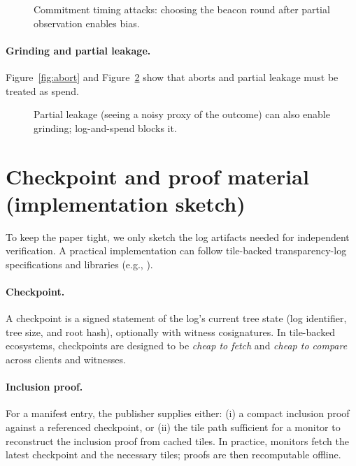 \documentclass[11pt]{article}
\begin{document}
\begin{figure}[t]
\centering
{}
\caption{Commitment timing attacks: choosing the beacon round after partial observation enables bias.}
\label{fig:commit_timing}
\end{figure}

\paragraph{Grinding and partial leakage.}
Figure~\ref{fig:abort} and Figure~\ref{fig:partial_leak} show that aborts and partial leakage must be treated as spend.

\begin{figure}[t]
\centering
{}
\caption{Partial leakage (seeing a noisy proxy of the outcome) can also enable grinding; log-and-spend blocks it.}
\label{fig:partial_leak}
\end{figure}

\appendix
\section{Checkpoint and proof material (implementation sketch)}
To keep the paper tight, we only sketch the log artifacts needed for independent verification.
A practical implementation can follow tile-backed transparency-log specifications and libraries (e.g., \cite{c2sp_tlog_checkpoint,c2sp_tlog_tiles,c2sp_tlog_proof,c2sp_tlog_witness,tessera_github}).

\paragraph{Checkpoint.}
A checkpoint is a signed statement of the log's current tree state (log identifier, tree size, and root hash), optionally with witness cosignatures.
In tile-backed ecosystems, checkpoints are designed to be \emph{cheap to fetch} and \emph{cheap to compare} across clients and witnesses.

\paragraph{Inclusion proof.}
For a manifest entry, the publisher supplies either:
(i) a compact inclusion proof against a referenced checkpoint, or
(ii) the tile path sufficient for a monitor to reconstruct the inclusion proof from cached tiles.
In practice, monitors fetch the latest checkpoint and the necessary tiles; proofs are then recomputable offline.
\end{document}
